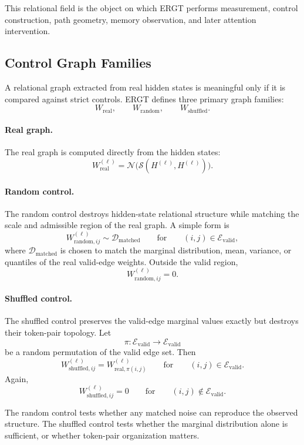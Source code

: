 \documentclass[11pt]{article}
\begin{document}
This relational field is the object on which ERGT performs measurement, control construction, path geometry, memory observation, and later attention intervention.

\subsection{Control Graph Families}

A relational graph extracted from real hidden states is meaningful only if it is compared against strict controls. ERGT defines three primary graph families:
\[
W_{\mathrm{real}},
\qquad
W_{\mathrm{random}},
\qquad
W_{\mathrm{shuffled}}.
\]

\paragraph{Real graph.}
The real graph is computed directly from the hidden states:
\[
W_{\mathrm{real}}^{(\ell)}
=
\mathcal{N}\big(\mathcal{S}(H^{(\ell)},H^{(\ell)})\big).
\]

\paragraph{Random control.}
The random control destroys hidden-state relational structure while matching the scale and admissible region of the real graph. A simple form is
\[
W_{\mathrm{random},ij}^{(\ell)}
\sim
\mathcal{D}_{\mathrm{matched}}
\qquad
\text{for}
\qquad
(i,j)\in\mathcal{E}_{\mathrm{valid}},
\]
where $\mathcal{D}_{\mathrm{matched}}$ is chosen to match the marginal distribution, mean, variance, or quantiles of the real valid-edge weights. Outside the valid region,
\[
W_{\mathrm{random},ij}^{(\ell)}=0.
\]

\paragraph{Shuffled control.}
The shuffled control preserves the valid-edge marginal values exactly but destroys their token-pair topology. Let
\[
\pi:\mathcal{E}_{\mathrm{valid}}\rightarrow\mathcal{E}_{\mathrm{valid}}
\]
be a random permutation of the valid edge set. Then
\[
W_{\mathrm{shuffled},ij}^{(\ell)}
=
W_{\mathrm{real},\pi(i,j)}^{(\ell)}
\qquad
\text{for}
\qquad
(i,j)\in\mathcal{E}_{\mathrm{valid}}.
\]
Again,
\[
W_{\mathrm{shuffled},ij}^{(\ell)}=0
\qquad
\text{for}
\qquad
(i,j)\notin\mathcal{E}_{\mathrm{valid}}.
\]

The random control tests whether any matched noise can reproduce the observed structure. The shuffled control tests whether the marginal distribution alone is sufficient, or whether token-pair organization matters.
\end{document}
